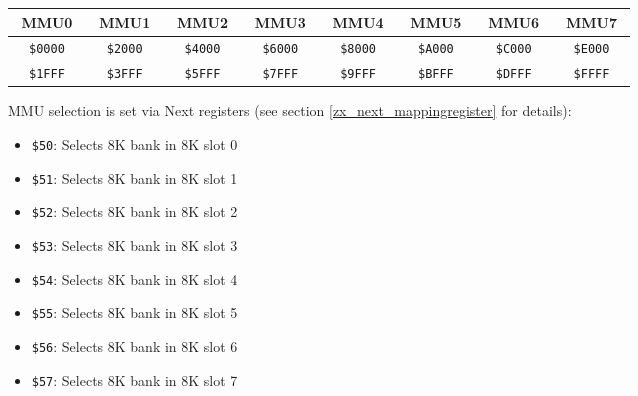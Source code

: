 \documentclass[twoside,openright,a4paper]{book}
\newcommand{\notet}{\rule{0pt}{2.4ex}}
\newcommand{\noteb}{\rule[-1.3ex]{0pt}{0pt}}
\begin{document}
\begingroup
	\setlength{\tabcolsep}{1pt}
	\begin{tabular}{|cccc|cccc|cccc|cccc|cccc|cccc|cccc|cccc|}
		\hline
		\multicolumn{4}{|c}{MMU0}\notet\noteb & 
			\multicolumn{4}{|c}{MMU1} & 
			\multicolumn{4}{|c}{MMU2} & 
			\multicolumn{4}{|c}{MMU3} & 
			\multicolumn{4}{|c}{MMU4} & 
			\multicolumn{4}{|c}{MMU5} & 
			\multicolumn{4}{|c}{MMU6} & 
			\multicolumn{4}{|c|}{MMU7} \\
		\hline
		\colnoline{$\leftarrow$}\notet & \multicolumn{2}{c}{\tt \$0000} & \colnoline{} &
			\colnoline{$\leftarrow$}\notet & \multicolumn{2}{c}{\tt \$2000} & \colnoline{} &
			\colnoline{$\leftarrow$}\notet & \multicolumn{2}{c}{\tt \$4000} & \colnoline{} &
			\colnoline{$\leftarrow$}\notet & \multicolumn{2}{c}{\tt \$6000} & \colnoline{} &
			\colnoline{$\leftarrow$}\notet & \multicolumn{2}{c}{\tt \$8000} & \colnoline{} &
			\colnoline{$\leftarrow$}\notet & \multicolumn{2}{c}{\tt \$A000} & \colnoline{} &
			\colnoline{$\leftarrow$}\notet & \multicolumn{2}{c}{\tt \$C000} & \colnoline{} &
			\colnoline{$\leftarrow$}\notet & \multicolumn{2}{c}{\tt \$E000} & \colnoline{} \\
		\colnoline{} & \multicolumn{2}{c}{\tt \$1FFF} & \colnoline{$\rightarrow$} &
			\colnoline{} & \multicolumn{2}{c}{\tt \$3FFF} & \colnoline{$\rightarrow$} &
			\colnoline{} & \multicolumn{2}{c}{\tt \$5FFF} & \colnoline{$\rightarrow$} &
			\colnoline{} & \multicolumn{2}{c}{\tt \$7FFF} & \colnoline{$\rightarrow$} &
			\colnoline{} & \multicolumn{2}{c}{\tt \$9FFF} & \colnoline{$\rightarrow$} &
			\colnoline{} & \multicolumn{2}{c}{\tt \$BFFF} & \colnoline{$\rightarrow$} &
			\colnoline{} & \multicolumn{2}{c}{\tt \$DFFF} & \colnoline{$\rightarrow$} &
			\colnoline{} & \multicolumn{2}{c}{\tt \$FFFF} & \colnoline{$\rightarrow$} \\
	\end{tabular}
\endgroup

MMU selection is set via Next registers (see section \ref{zx_next_mappingregister} for details):

\begin{itemize}
	\item {\tt \$50}: Selects 8K bank in 8K slot 0
	\item {\tt \$51}: Selects 8K bank in 8K slot 1
	\item {\tt \$52}: Selects 8K bank in 8K slot 2
	\item {\tt \$53}: Selects 8K bank in 8K slot 3
	\item {\tt \$54}: Selects 8K bank in 8K slot 4
	\item {\tt \$55}: Selects 8K bank in 8K slot 5
	\item {\tt \$56}: Selects 8K bank in 8K slot 6
	\item {\tt \$57}: Selects 8K bank in 8K slot 7
\end{itemize}
\end{document}
